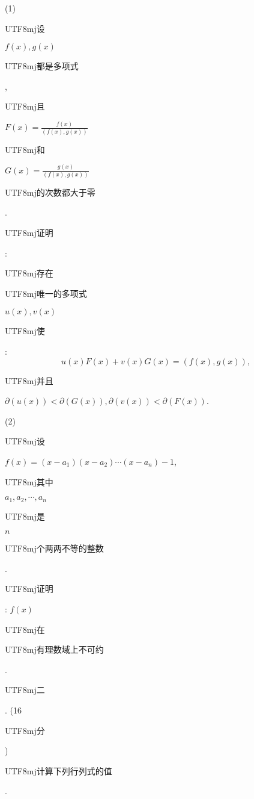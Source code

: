\documentclass[10pt]{article}
\begin{document}
(1) \begin{CJK}{UTF8}{mj}设\end{CJK} $f(x), g(x)$ \begin{CJK}{UTF8}{mj}都是多项式\end{CJK}, \begin{CJK}{UTF8}{mj}且\end{CJK} $F(x)=\frac{f(x)}{(f(x), g(x))}$ \begin{CJK}{UTF8}{mj}和\end{CJK} $G(x)=\frac{g(x)}{(f(x), g(x))}$ \begin{CJK}{UTF8}{mj}的次数都大于零\end{CJK}. \begin{CJK}{UTF8}{mj}证明\end{CJK}: \begin{CJK}{UTF8}{mj}存在\end{CJK} \begin{CJK}{UTF8}{mj}唯一的多项式\end{CJK} $u(x), v(x)$ \begin{CJK}{UTF8}{mj}使\end{CJK}:
$$
u(x) F(x)+v(x) G(x)=(f(x), g(x)),
$$
\begin{CJK}{UTF8}{mj}并且\end{CJK} $\partial(u(x))<\partial(G(x)), \partial(v(x))<\partial(F(x))$.

(2) \begin{CJK}{UTF8}{mj}设\end{CJK} $f(x)=\left(x-a_{1}\right)\left(x-a_{2}\right) \cdots\left(x-a_{n}\right)-1$, \begin{CJK}{UTF8}{mj}其中\end{CJK} $a_{1}, a_{2}, \cdots, a_{n}$ \begin{CJK}{UTF8}{mj}是\end{CJK} $n$ \begin{CJK}{UTF8}{mj}个两两不等的整数\end{CJK}. \begin{CJK}{UTF8}{mj}证明\end{CJK}: $f(x)$ \begin{CJK}{UTF8}{mj}在\end{CJK} \begin{CJK}{UTF8}{mj}有理数域上不可约\end{CJK}.

\begin{CJK}{UTF8}{mj}二\end{CJK}. (16 \begin{CJK}{UTF8}{mj}分\end{CJK}) \begin{CJK}{UTF8}{mj}计算下列行列式的值\end{CJK}.
\end{document}
